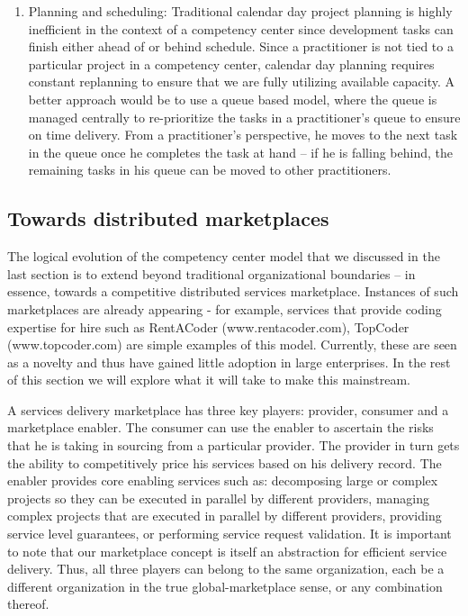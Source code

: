 \begin{enumerate}
\item Planning and scheduling: Traditional calendar day project planning is highly inefficient in the context of a competency center since development tasks can finish either ahead of or behind schedule. Since a practitioner is not tied to a particular project in a competency center, calendar day planning requires constant replanning to ensure that we are fully utilizing available capacity. A better approach would be to use a queue based model, where the queue is managed centrally to re-prioritize the tasks in a practitioner's queue to ensure on time delivery. From a practitioner's perspective, he moves to the next task in the queue once he completes the task at hand -- if he is falling behind, the remaining tasks in his queue can be moved to other practitioners.
\end{enumerate}

\subsection{Towards distributed marketplaces}

The logical evolution of the competency center model that we discussed in the last section is to extend beyond traditional organizational boundaries -- in essence, towards a competitive distributed services marketplace. Instances of such marketplaces are already appearing - for example, services that provide coding expertise for hire such as RentACoder (www.rentacoder.com), TopCoder (www.topcoder.com) are simple examples of this model. Currently, these are seen as a novelty and thus have gained little adoption in large enterprises. In the rest of this section we will explore what it will take to make this mainstream.

 A services delivery marketplace has three key players: provider, consumer and a marketplace enabler. The consumer can use the enabler to ascertain the risks that he is taking in sourcing from a particular provider. The provider in turn gets the ability to competitively price his services based on his delivery record. The enabler provides core enabling services such as: decomposing large or complex projects so they can be executed in parallel by different providers, managing complex projects that are executed in parallel by different providers, providing service level guarantees, or performing service request validation. It is important to note that our marketplace concept is itself an abstraction for efficient service delivery. Thus, all three players can belong to the same organization, each be a different organization in the true global-marketplace sense, or any combination thereof.

